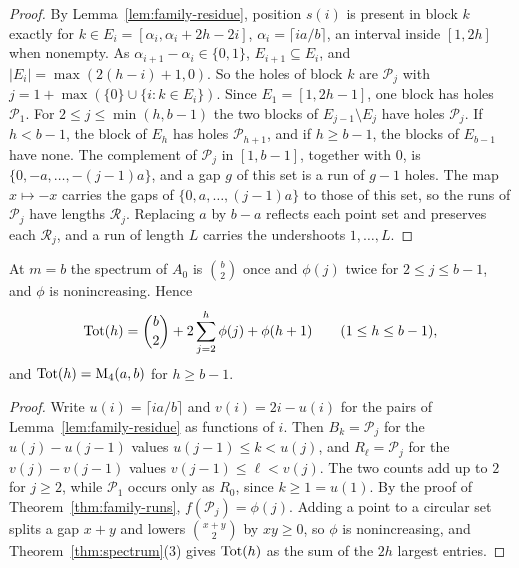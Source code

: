 \begin{proof}
By Lemma~\ref{lem:family-residue}, position $s(i)$ is present in block $k$ exactly for $k\in E_i=[\alpha_i,\alpha_i+2h-2i]$, $\alpha_i=\lceil ia/b\rceil$, an interval inside $[1,2h]$ when nonempty. As $\alpha_{i+1}-\alpha_i\in\{0,1\}$, $E_{i+1}\subseteq E_i$, and $|E_i|=\max(2(h-i)+1,0)$. So the holes of block $k$ are $\mathcal P_j$ with $j=1+\max(\{0\}\cup\{i:k\in E_i\})$. Since $E_1=[1,2h-1]$, one block has holes $\mathcal P_1$. For $2\le j\le\min(h,b-1)$ the two blocks of $E_{j-1}\setminus E_j$ have holes $\mathcal P_j$. If $h<b-1$, the block of $E_h$ has holes $\mathcal P_{h+1}$, and if $h\ge b-1$, the blocks of $E_{b-1}$ have none. The complement of $\mathcal P_j$ in $[1,b-1]$, together with $0$, is $\{0,-a,\dots,-(j-1)a\}$, and a gap $g$ of this set is a run of $g-1$ holes. The map $x\mapsto-x$ carries the gaps of $\{0,a,\dots,(j-1)a\}$ to those of this set, so the runs of $\mathcal P_j$ have lengths $\mathcal R_j$. Replacing $a$ by $b-a$ reflects each point set and preserves each $\mathcal R_j$, and a run of length $L$ carries the undershoots $1,\dots,L$.
\end{proof}

\begin{theorem}\label{thm:family-spectrum}
At $m=b$ the spectrum of $A_0$ is $\binom b2$ once and $\phi(j)$ twice for $2\le j\le b-1$, and $\phi$ is nonincreasing. Hence
\begin{equation}\label{eq:family-tot}
\operatorname{Tot}(h)=\binom b2+2\sum_{j=2}^{h}\phi(j)+\phi(h+1)\qquad(1\le h\le b-1),
\end{equation}
and $\operatorname{Tot}(h)=\operatorname{M}_4(a,b)$ for $h\ge b-1$.
\end{theorem}

\begin{proof}
Write $u(i)=\lceil ia/b\rceil$ and $v(i)=2i-u(i)$ for the pairs of Lemma~\ref{lem:family-residue} as functions of $i$. Then $B_k=\mathcal P_j$ for the $u(j)-u(j-1)$ values $u(j-1)\le k<u(j)$, and $R_\ell=\mathcal P_j$ for the $v(j)-v(j-1)$ values $v(j-1)\le\ell<v(j)$. The two counts add up to $2$ for $j\ge2$, while $\mathcal P_1$ occurs only as $R_0$, since $k\ge1=u(1)$. By the proof of Theorem~\ref{thm:family-runs}, $f(\mathcal P_j)=\phi(j)$. Adding a point to a circular set splits a gap $x+y$ and lowers $\binom{x+y}2$ by $xy\ge0$, so $\phi$ is nonincreasing, and Theorem~\ref{thm:spectrum}(3) gives $\operatorname{Tot}(h)$ as the sum of the $2h$ largest entries.
\end{proof}

